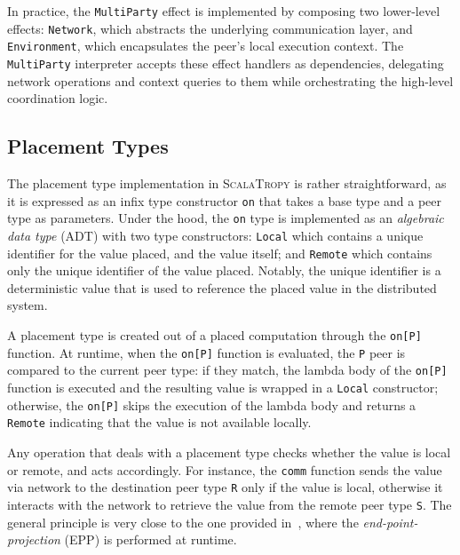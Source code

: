 \documentclass[runningheads]{llncs}
\newcommand{\ourLang}{\textsc{ScalaTropy}}
\newcommand{\code}[1]{\lstinline[style=scala3,basicstyle=\ttfamily\small\color{vscLightText}]{#1}}
\begin{document}
In practice,
the \code{MultiParty} effect is implemented by composing two lower-level effects:
\code{Network}, which abstracts the underlying communication layer,
and \code{Environment}, which encapsulates the peer's local execution context.
%
The \code{MultiParty} interpreter accepts these effect handlers as dependencies,
delegating network operations and context queries to them while orchestrating the high-level coordination logic.
%

\subsection{Placement Types}
The placement type implementation in \ourLang{} is rather straightforward,
as it is expressed as an infix type constructor \code{on} that takes a base type and a peer type as parameters.
%
Under the hood,
the \code{on} type is implemented as an \emph{algebraic data type} (ADT) with two type constructors:
\code{Local} which contains a unique identifier for the value placed,
and the value itself;
and \code{Remote} which contains only the unique identifier of the value placed.
%
Notably,
the unique identifier is a deterministic value that is used to reference the placed value in the distributed system.

A placement type is created out of a placed computation through the \code{on[P]} function.
%
At runtime,
when the \code{on[P]} function is evaluated,
the \code{P} peer is compared to the current peer type:
if they match,
the lambda body of the \code{on[P]} function is executed
and the resulting value is wrapped in a \code{Local} constructor;
otherwise,
the \code{on[P]} skips the execution of the lambda body and returns a \code{Remote} indicating that the value is not available locally.

Any operation that deals with a placement type checks whether the value is local or remote,
and acts accordingly.
%
For instance,
the \code{comm} function sends the value via network to the destination peer type \code{R} only if the value is local,
otherwise it interacts with the network to retrieve the value from the remote peer type \code{S}.
%
The general principle is very close to the one provided in~\cite{10.1145/3729296},
where the \emph{end-point-projection} (EPP) is performed at runtime.
\end{document}
